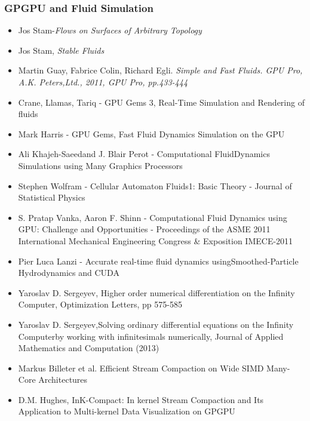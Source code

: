 \documentclass[a4paper]{article}
\begin{document}
\subsubsection{GPGPU and Fluid Simulation}
	\begin{itemize}
	  \item  Jos Stam-\textit{Flows on Surfaces of Arbitrary Topology}
	  \item Jos Stam, \textit{Stable Fluids}
	  \item Martin Guay, Fabrice Colin, Richard Egli. \textit{Simple and Fast
	  Fluids. GPU Pro, A.K. Peters,Ltd., 2011, GPU Pro, pp.433-444}
	  \item Crane, Llamas, Tariq - GPU Gems 3, Real-Time Simulation and Rendering
	  of fluids
	   \item Mark Harris - GPU Gems,  Fast Fluid Dynamics Simulation on the GPU
	   \item Ali Khajeh-Saeedand J. Blair Perot - Computational FluidDynamics
	   Simulations using Many Graphics Processors
	   \item Stephen Wolfram - Cellular Automaton Fluids1: Basic Theory - Journal
	   of Statistical Physics
	   \item S. Pratap Vanka, Aaron F. Shinn - Computational Fluid
	   Dynamics using GPU: Challenge and Opportunities - Proceedings of the ASME
	   2011 International Mechanical Engineering Congress & Exposition IMECE-2011
	   \item Pier Luca Lanzi - Accurate real-time fluid dynamics
	   usingSmoothed-Particle Hydrodynamics and CUDA
	   \item Yaroslav D. Sergeyev, Higher order numerical differentiation on the
	   Infinity Computer, Optimization Letters, pp 575-585
	   \item Yaroslav D. Sergeyev,Solving ordinary differential equations on the
	   Infinity Computerby working with infinitesimals numerically, Journal of Applied Mathematics and
	   Computation (2013)
	   \item Markus Billeter et al. Efficient Stream Compaction on Wide SIMD
	   Many-Core Architectures
	   \item D.M. Hughes, InK-Compact: In kernel Stream Compaction and Its
	   Application to Multi-kernel Data Visualization on GPGPU
\end{itemize}
\end{document}
